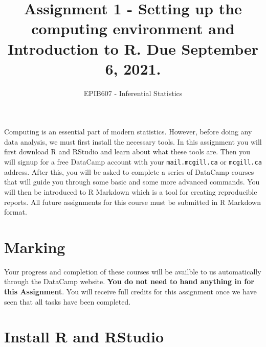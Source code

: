 \documentclass[letterpaper,12pt,twoside,]{pinp}
\title{Assignment 1 - Setting up the computing environment and
Introduction to R. Due September 6, 2021.}
\author[a]{EPIB607 - Inferential Statistics}
\affil[a]{Fall 2021, McGill University}
\begin{document}
\verticaladjustment{-2pt}

\maketitle
\thispagestyle{firststyle}



\tableofcontents

\vspace*{1in}

Computing is an essential part of modern statistics. However, before
doing any data analysis, we must first install the necessary tools. In
this assignment you will first download R and RStudio and learn about
what these tools are. Then you will signup for a free DataCamp account
with your \texttt{mail.mcgill.ca} or \texttt{mcgill.ca} address. After
this, you will be asked to complete a series of DataCamp courses that
will guide you through some basic and some more advanced commands. You
will then be introduced to R Markdown which is a tool for creating
reproducible reports. All future assignments for this course must be
submitted in R Markdown format.

\newpage

\hypertarget{marking}{%
\section{Marking}\label{marking}}

Your progress and completion of these courses will be availble to us
automatically through the DataCamp website. \textbf{You do not need to
hand anything in for this Assignment}. You will receive full credits for
this assignment once we have seen that all tasks have been completed.

\hypertarget{install-r-and-rstudio}{%
\section{Install R and RStudio}\label{install-r-and-rstudio}}
\end{document}

